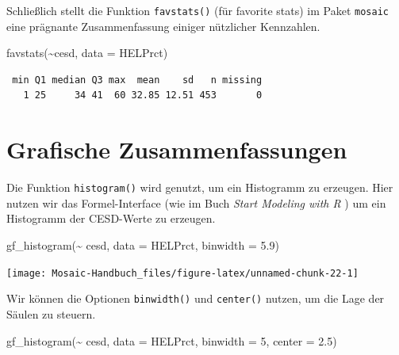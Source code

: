 \documentclass[
  ngerman,
]{scrbook}
\newenvironment{Shaded}{\begin{snugshade}}{\end{snugshade}}
\newcommand{\AttributeTok}[1]{\textcolor[rgb]{0.77,0.63,0.00}{#1}}
\newcommand{\DecValTok}[1]{\textcolor[rgb]{0.00,0.00,0.81}{#1}}
\newcommand{\FloatTok}[1]{\textcolor[rgb]{0.00,0.00,0.81}{#1}}
\newcommand{\FunctionTok}[1]{\textcolor[rgb]{0.00,0.00,0.00}{#1}}
\newcommand{\NormalTok}[1]{#1}
\newcommand{\SpecialCharTok}[1]{\textcolor[rgb]{0.00,0.00,0.00}{#1}}
\begin{document}
Schließlich stellt die Funktion \texttt{favstats()} (für favorite stats) im Paket \texttt{mosaic} eine prägnante Zusammenfassung einiger nützlicher Kennzahlen.

\begin{Shaded}
\begin{Highlighting}[]
\FunctionTok{favstats}\NormalTok{(}\SpecialCharTok{\textasciitilde{}}\NormalTok{cesd, }\AttributeTok{data =}\NormalTok{ HELPrct)}
\end{Highlighting}
\end{Shaded}

\begin{verbatim}
 min Q1 median Q3 max  mean    sd   n missing
   1 25     34 41  60 32.85 12.51 453       0
\end{verbatim}

\hypertarget{grafische-zusammenfassungen}{%
\section{Grafische Zusammenfassungen}\label{grafische-zusammenfassungen}}

Die Funktion \texttt{histogram()} wird genutzt, um ein Histogramm zu erzeugen. Hier nutzen wir das Formel-Interface (wie im Buch \emph{Start Modeling with R} \autocite{TeachingR}) um ein Histogramm der CESD-Werte zu erzeugen.

\begin{Shaded}
\begin{Highlighting}[]
\FunctionTok{gf\_histogram}\NormalTok{(}\SpecialCharTok{\textasciitilde{}}\NormalTok{ cesd, }\AttributeTok{data =}\NormalTok{ HELPrct, }\AttributeTok{binwidth =} \FloatTok{5.9}\NormalTok{)}
\end{Highlighting}
\end{Shaded}

\begin{center}\texttt{[image: Mosaic-Handbuch\_files/figure-latex/unnamed-chunk-22-1]} \end{center}

Wir können die Optionen \texttt{binwidth()} und \texttt{center()} nutzen, um die Lage der Säulen zu steuern.

\begin{Shaded}
\begin{Highlighting}[]
\FunctionTok{gf\_histogram}\NormalTok{(}\SpecialCharTok{\textasciitilde{}}\NormalTok{ cesd, }\AttributeTok{data =}\NormalTok{ HELPrct, }\AttributeTok{binwidth =} \DecValTok{5}\NormalTok{, }\AttributeTok{center =} \FloatTok{2.5}\NormalTok{)}
\end{Highlighting}
\end{Shaded}
\end{document}
